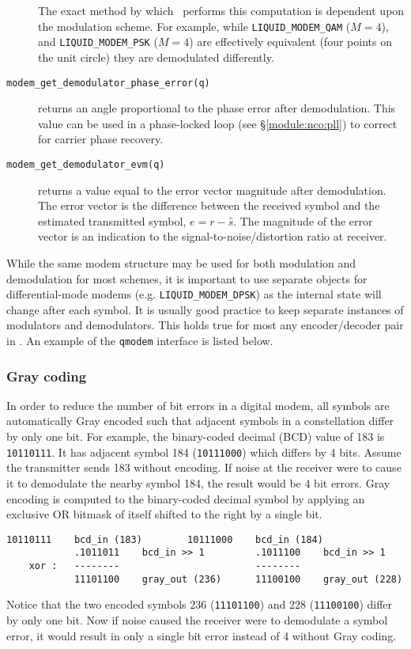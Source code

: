 \begin{description}
    The exact method by which \liquid\ performs this computation is
    dependent upon the modulation scheme.
    For example, while
    {\tt LIQUID\_MODEM\_QAM} ($M=4$), and
    {\tt LIQUID\_MODEM\_PSK} ($M=4$)
    are effectively equivalent (four points on the unit circle)
    they are demodulated differently.
\item[{\tt modem\_get\_demodulator\_phase\_error(q)}]
    returns an angle proportional to the phase error after demodulation.
    This value can be used in a phase-locked loop
    (see \S\ref{module:nco:pll})
    to correct for carrier phase recovery.
\item[{\tt modem\_get\_demodulator\_evm(q)}]
    returns a value equal to the error vector magnitude after demodulation.
    The error vector is the difference between the received symbol and the
    estimated transmitted symbol, $e = r - \hat{s}$.
    The magnitude of the error vector is an indication to the
    signal-to-noise/distortion ratio at receiver.
\end{description}

While the same modem structure may be used for both modulation and
demodulation for most schemes, it is important to use separate objects
for differential-mode modems (e.g. {\tt LIQUID\_MODEM\_DPSK}) as the internal state
will change after each symbol.
It is usually good practice to keep separate instances of modulators and
demodulators.
This holds true for most any encoder/decoder pair in \liquid.
%
An example of the {\tt qmodem} interface is listed below.
%

%

\subsubsection{Gray coding}
\label{module:modem:digital:gray_coding}
In order to reduce the number of bit errors in a digital modem,
all symbols are automatically Gray encoded such that
adjacent symbols in a constellation differ by only one bit.
%
For example, the binary-coded decimal (BCD) value of 183 is {\tt 10110111}.
It has adjacent symbol 184 ({\tt 10111000}) which differs by 4 bits.
Assume the transmitter sends 183 without encoding.
If noise at the receiver were to cause it to demodulate the nearby
symbol 184, the result would be 4 bit errors.
%
Gray encoding is computed to the binary-coded decimal symbol
by applying an exclusive OR bitmask of itself shifted to the right by a
single bit.
%
\begin{Verbatim}[fontsize=\small]
            10110111    bcd_in (183)        10111000    bcd_in (184)
            .1011011    bcd_in >> 1         .1011100    bcd_in >> 1
    xor :   --------                        --------
            11101100    gray_out (236)      11100100    gray_out (228)
\end{Verbatim}
%
Notice that the two encoded symbols
236 ({\tt 11101100}) and
228 ({\tt 11100100}) differ by only one bit.
Now if noise caused the receiver were to demodulate a symbol error, it would
result in only a single bit error instead of 4 without Gray coding.

